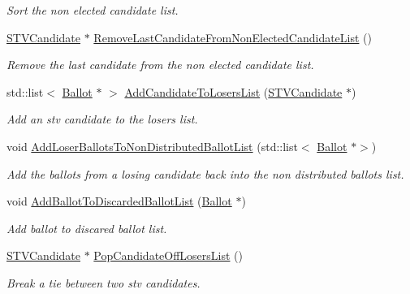 \begin{DoxyCompactItemize}
\begin{DoxyCompactList}\small\item\em Sort the non elected candidate list. \end{DoxyCompactList}\item 
\hyperlink{classSTVCandidate}{S\+T\+V\+Candidate} $\ast$ \hyperlink{classSTVElectionRecord_a741e5d955734ed07db8465cbaa3b0091}{Remove\+Last\+Candidate\+From\+Non\+Elected\+Candidate\+List} ()
\begin{DoxyCompactList}\small\item\em Remove the last candidate from the non elected candidate list. \end{DoxyCompactList}\item 
std\+::list$<$ \hyperlink{classBallot}{Ballot} $\ast$ $>$ \hyperlink{classSTVElectionRecord_a5909386b596e6563a2ec332921133ab6}{Add\+Candidate\+To\+Losers\+List} (\hyperlink{classSTVCandidate}{S\+T\+V\+Candidate} $\ast$)
\begin{DoxyCompactList}\small\item\em Add an stv candidate to the losers list. \end{DoxyCompactList}\item 
void \hyperlink{classSTVElectionRecord_a04c1523f0e9f60e87544542fc39c56c4}{Add\+Loser\+Ballots\+To\+Non\+Distributed\+Ballot\+List} (std\+::list$<$ \hyperlink{classBallot}{Ballot} $\ast$$>$)
\begin{DoxyCompactList}\small\item\em Add the ballots from a losing candidate back into the non distributed ballots list. \end{DoxyCompactList}\item 
void \hyperlink{classSTVElectionRecord_a441b1386f1c250a6e2c92763b31bd1a2}{Add\+Ballot\+To\+Discarded\+Ballot\+List} (\hyperlink{classBallot}{Ballot} $\ast$)
\begin{DoxyCompactList}\small\item\em Add ballot to discared ballot list. \end{DoxyCompactList}\item 
\hyperlink{classSTVCandidate}{S\+T\+V\+Candidate} $\ast$ \hyperlink{classSTVElectionRecord_ae7078fcee0d4b897d1536bee9ac342f6}{Pop\+Candidate\+Off\+Losers\+List} ()
\begin{DoxyCompactList}\small\item\em Break a tie between two stv candidates. \end{DoxyCompactList}\end{DoxyCompactItemize}


